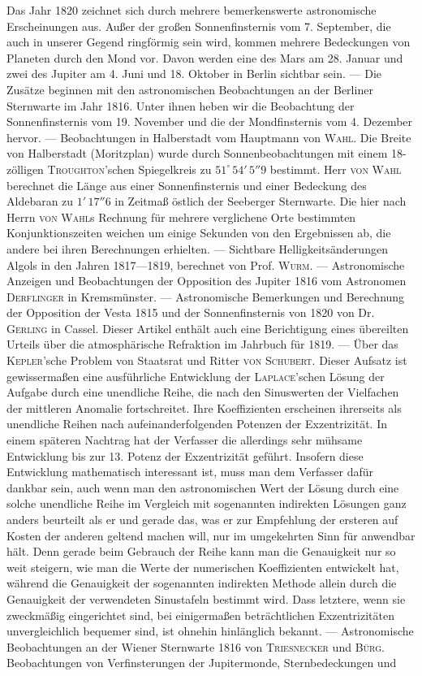 \begingroup{}\relax
Das Jahr 1820 zeichnet sich durch mehrere bemerkenswerte astronomische Erscheinungen aus. Außer der großen Sonnenfinsternis vom 7. September, die auch in unserer Gegend ringförmig sein wird, kommen mehrere Bedeckungen von Planeten durch den Mond vor. Davon werden eine des Mars am 28. Januar und zwei des Jupiter am 4. Juni und 18. Oktober in Berlin sichtbar sein. --- Die Zusätze beginnen mit den astronomischen Beobachtungen an der Berliner Sternwarte im Jahr 1816. Unter ihnen heben wir die Beobachtung der Sonnenfinsternis vom 19. November und die der Mondfinsternis vom 4. Dezember hervor. --- Beobachtungen in Halberstadt vom Hauptmann von \textsc{Wahl}. Die Breite von Halberstadt (Moritzplan) wurde durch Sonnenbeobachtungen mit einem 18-zölligen \textsc{Troughton}'schen Spiegelkreis zu $51^\circ\,54'\,5''9$ bestimmt. Herr \textsc{von Wahl} berechnet die Länge aus einer Sonnenfinsternis und einer Bedeckung des Aldebaran zu $1'\,17''6$ in Zeitmaß östlich der Seeberger Sternwarte. Die hier nach Herrn \textsc{von Wahl}s Rechnung für mehrere verglichene Orte bestimmten Konjunktionszeiten weichen um einige Sekunden von den Ergebnissen ab, die andere bei ihren Berechnungen erhielten. --- Sichtbare Helligkeitsänderungen Algols in den Jahren 1817---1819, berechnet von Prof. \textsc{Wurm}. --- Astronomische Anzeigen und Beobachtungen der Opposition des Jupiter 1816 vom Astronomen \textsc{Derflinger} in Kremsmünster. --- Astronomische Bemerkungen und Berechnung der Opposition der Vesta 1815 und der Sonnenfinsternis von 1820 von Dr. \textsc{Gerling} in Cassel. Dieser Artikel enthält auch eine Berichtigung eines übereilten Urteils über die atmosphärische Refraktion im Jahrbuch für 1819. --- Über das \textsc{Kepler}'sche Problem von Staatsrat und Ritter \textsc{von Schubert}. Dieser Aufsatz ist gewissermaßen eine ausführliche Entwicklung der \textsc{Laplace}'schen Lösung der Aufgabe durch eine unendliche Reihe, die nach den Sinuswerten der Vielfachen der mittleren Anomalie fortschreitet. Ihre Koeffizienten erscheinen ihrerseits als unendliche Reihen nach aufeinanderfolgenden Potenzen der Exzentrizität. In einem späteren Nachtrag hat der Verfasser die allerdings sehr mühsame Entwicklung bis zur 13. Potenz der Exzentrizität geführt. Insofern diese Entwicklung mathematisch interessant ist, muss man dem Verfasser dafür dankbar sein, auch wenn man den astronomischen Wert der Lösung durch eine solche unendliche Reihe im Vergleich mit sogenannten indirekten Lösungen ganz anders beurteilt als er und gerade das, was er zur Empfehlung der ersteren auf Kosten der anderen geltend machen will, nur im umgekehrten Sinn für anwendbar hält. Denn gerade beim Gebrauch der Reihe kann man die Genauigkeit nur so weit steigern, wie man die Werte der numerischen Koeffizienten entwickelt hat, während die Genauigkeit der sogenannten indirekten Methode allein durch die Genauigkeit der verwendeten Sinustafeln bestimmt wird. Dass letztere, wenn sie zweckmäßig eingerichtet sind, bei einigermaßen beträchtlichen Exzentrizitäten unvergleichlich bequemer sind, ist ohnehin hinlänglich bekannt. --- Astronomische Beobachtungen an der Wiener Sternwarte 1816 von \textsc{Triesnecker} und \textsc{Bürg}. Beobachtungen von Verfinsterungen der Jupitermonde, Sternbedeckungen und 